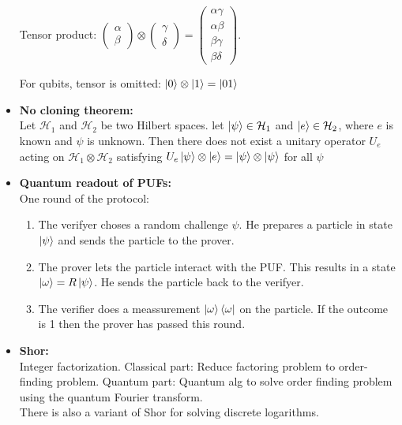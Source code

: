 \documentclass[twocolumn,9pt]{extarticle}
\begin{document}
\begin{itemize}
	Tensor product:
	$\begin{pmatrix}\alpha \\ \beta\end{pmatrix} \otimes \begin{pmatrix}\gamma \\ \delta\end{pmatrix} = \begin{pmatrix}\alpha\gamma \\ \alpha\beta \\ \beta\gamma \\ \beta\delta\end{pmatrix}$.

	For qubits, tensor is omitted: $\ket{0} \otimes \ket{1} = \ket{01}$

	\item \textbf{No cloning theorem: } \\
	Let $\mathcal{H}_1$ and $\mathcal{H}_2$ be two Hilbert spaces. let $\ket{\psi} \in \mathcal{H}_1$ and $\ket{e} \in \mathcal{H}_2$, where $e$ is known and $\psi$ is unknown. Then there does not exist a unitary operator $U_e$ acting on $\mathcal{H}_1 \otimes \mathcal{H}_2$ satisfying $U_e\ket{\psi} \otimes \ket{e} = \ket{\psi} \otimes \ket{\psi}$ for all $\psi$


	\item \textbf{Quantum readout of PUFs:} \\
	One round of the protocol:
	\begin{enumerate}
		\item The verifyer choses a random challenge $\psi$. He prepares a particle in state $\ket{\psi}$ and sends the particle to the prover.
		\item The prover lets the particle interact with the PUF. This results in a state $\ket{\omega} =  R\ket{\psi}$. He sends the particle back to the verifyer.
		\item The verifier does a meassurement $\ket{\omega}\bra{\omega}$ on the particle. If the outcome is 1 then the prover has passed this round.
	\end{enumerate}

	\item \textbf{Shor:} \\
	Integer factorization. Classical part: Reduce factoring problem to order-finding problem. Quantum part: Quantum alg to solve order finding problem using the quantum Fourier transform.\\
	There is also a variant of Shor for solving discrete logarithms.

\end{itemize}
\end{document}
